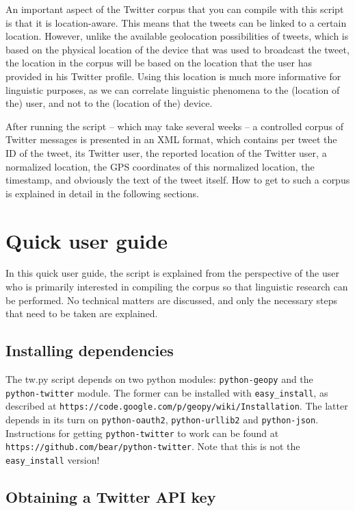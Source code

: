 \documentclass[a4paper,11pt]{article}
\begin{document}
An important aspect of the Twitter corpus that you can compile with this script is that it is location-aware. This means that the tweets can be linked to a certain location. However, unlike the available geolocation possibilities of tweets, which is based on the physical location of the device that was used to broadcast the tweet, the location in the corpus will be based on the location that the user has provided in his Twitter profile. Using this location is much more informative for linguistic purposes, as we can correlate linguistic phenomena to the (location of the) user, and not to the (location of the) device.

After running the script -- which may take several weeks -- a controlled corpus of Twitter messages is presented in an XML format, which contains per tweet the ID of the tweet, its Twitter user, the reported location of the Twitter user, a normalized location, the GPS coordinates of this normalized location, the timestamp, and obviously the text of the tweet itself. How to get to such a corpus is explained in detail in the following sections.

\section{Quick user guide}

In this quick user guide, the script is explained from the perspective of the user who is primarily interested in compiling the corpus so that linguistic research can be performed. No technical matters are discussed, and only the necessary steps that need to be taken are explained.

\subsection{Installing dependencies}

The tw.py script depends on two python modules: \texttt{python-geopy} and the \texttt{python-twitter} module. The former can be installed with \texttt{easy\_install}, as described at \texttt{https://code.google.com/p/geopy/wiki/Installation}. The latter depends in its turn on \texttt{python-oauth2}, \texttt{python-urllib2} and \texttt{python-json}. Instructions for getting \texttt{python-twitter} to work can be found at \texttt{https://github.com/bear/python-twitter}. Note that this is not the \texttt{easy\_install} version!

\subsection{Obtaining a Twitter API key}
\end{document}
